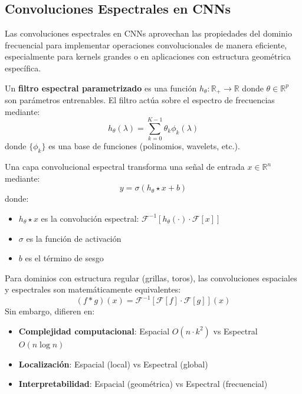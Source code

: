\subsection{Convoluciones Espectrales en CNNs}\label{subsec:convoluciones_espectrales_cnns}

Las convoluciones espectrales en CNNs aprovechan las propiedades del dominio frecuencial para implementar operaciones convolucionales de manera eficiente, especialmente para kernels grandes o en aplicaciones con estructura geométrica específica.

\begin{definition}\label{def:filtro_espectral_parametrizado}
Un \textbf{filtro espectral parametrizado} es una función $h_\theta: \mathbb{R}_+ \to \mathbb{R}$ donde $\theta \in \mathbb{R}^p$ son parámetros entrenables. El filtro actúa sobre el espectro de frecuencias mediante:
\begin{equation}
h_\theta(\lambda) = \sum_{k=0}^{K-1} \theta_k \phi_k(\lambda)
\end{equation}
donde $\{\phi_k\}$ es una base de funciones (polinomios, wavelets, etc.).
\end{definition}

\begin{definition}\label{def:capa_convolucional_espectral}
Una capa convolucional espectral transforma una señal de entrada $x \in \mathbb{R}^n$ mediante:
\begin{equation}
y = \sigma(h_\theta \star x + b)
\end{equation}
donde:
\begin{itemize}
    \item $h_\theta \star x$ es la convolución espectral: $\mathcal{F}^{-1}[h_\theta(\cdot) \cdot \mathcal{F}[x]]$
    \item $\sigma$ es la función de activación
    \item $b$ es el término de sesgo
\end{itemize}
\end{definition}

\begin{theorem}\label{thm:equivalencia_espacial_espectral}
Para dominios con estructura regular (grillas, toros), las convoluciones espaciales y espectrales son matemáticamente equivalentes:
\begin{equation}
(f * g)(x) = \mathcal{F}^{-1}[\mathcal{F}[f] \cdot \mathcal{F}[g]](x)
\end{equation}
Sin embargo, difieren en:
\begin{itemize}
    \item \textbf{Complejidad computacional}: Espacial $O(n \cdot k^2)$ vs Espectral $O(n \log n)$
    \item \textbf{Localización}: Espacial (local) vs Espectral (global)
    \item \textbf{Interpretabilidad}: Espacial (geométrica) vs Espectral (frecuencial)
\end{itemize}
\end{theorem}

